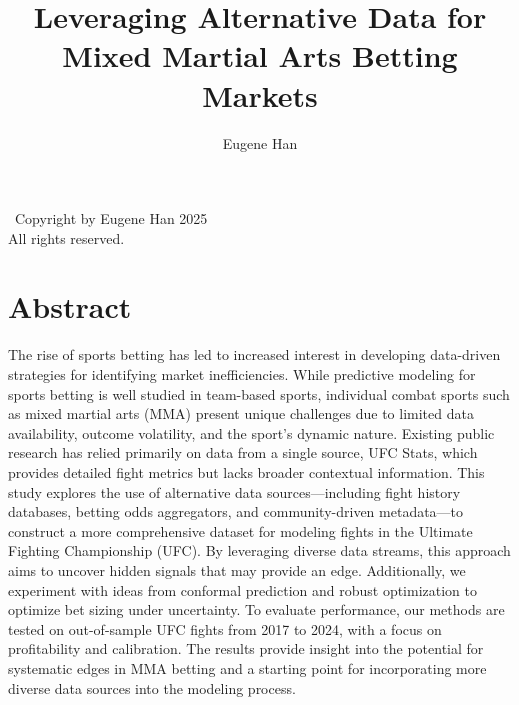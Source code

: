 \documentclass[12pt,twoside]{report}
\title{Leveraging Alternative Data for Mixed Martial Arts Betting Markets}
\author{Eugene Han}
\begin{document}




\clearpage\chapter*{}
\begin{center}
    \vspace*{\fill} %
    \large \textcopyright\  Copyright by Eugene Han 2025 \\
    All rights reserved.
    \vspace*{\fill} %
\end{center}

\clearpage\chapter*{}
\setlength{\parindent}{1.5em}
\onehalfspacing

\chapter*{Abstract}

The rise of sports betting has led to increased interest in developing data-driven strategies for identifying market inefficiencies. While predictive modeling for sports betting is well studied in team-based sports, individual combat sports such as mixed martial arts (MMA) present unique challenges due to limited data availability, outcome volatility, and the sport’s dynamic nature. Existing public research has relied primarily on data from a single source, UFC Stats, which provides detailed fight metrics but lacks broader contextual information. This study explores the use of alternative data sources---including fight history databases, betting odds aggregators, and community-driven metadata---to construct a more comprehensive dataset for modeling fights in the Ultimate Fighting Championship (UFC). By leveraging diverse data streams, this approach aims to uncover hidden signals that may provide an edge. Additionally, we experiment with ideas from conformal prediction and robust optimization to optimize bet sizing under uncertainty. To evaluate performance, our methods are tested on out-of-sample UFC fights from 2017 to 2024, with a focus on profitability and calibration. The results provide insight into the potential for systematic edges in MMA betting and a starting point for incorporating more diverse data sources into the modeling process.
\end{document}
